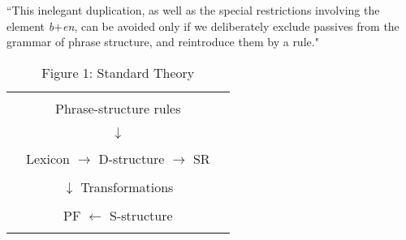 \documentclass{article}
\begin{document}
\ea \label{PassRedup}
``This inelegant duplication, as well as the special restrictions involving the element \textit{b}$+$\textit{en}, can be avoided only if we deliberately exclude passives from the grammar of phrase structure, and reintroduce them by a rule." \citep[p.~43]{Chomsky57}
\z
\begin{table}[btp] 
\centering
    \begin{tabular}{|c c c|}
    \hline
         & & \\
         & Phrase-structure rules &  \\
         & & \\
         & $\downarrow$ &  \\
         & & \\
         & \hspace{-0.35in} Lexicon $\rightarrow$ D-structure $\rightarrow$ SR &  \\
         & & \\
         & \hspace{.95in} $\downarrow$ Transformations & \\
         & & \\
         & PF $\leftarrow$ S-structure \hspace{.345in} & \\
         & & \\
    \hline
    \end{tabular}
\caption*{Figure 1: Standard Theory}
\end{table}
\end{document}
